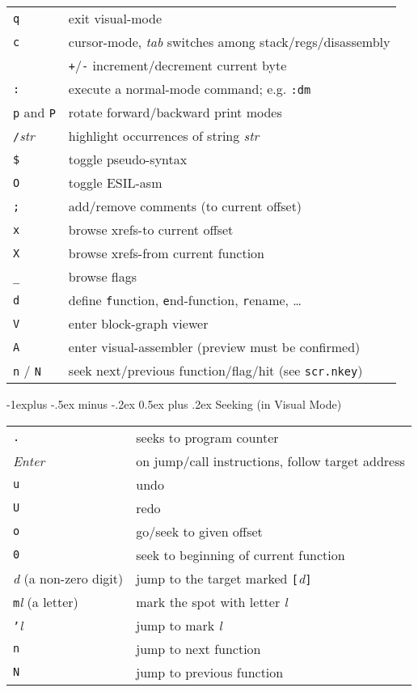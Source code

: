 \documentclass[a4paper,landscape]{article}
\makeatletter
\renewcommand{\subsection}{\@startsection{subsection}{2}{0mm}%
                                {-1explus -.5ex minus -.2ex}%
                                {0.5ex plus .2ex}%
                                {\normalfont\normalsize\bfseries}}
\makeatother
\begin{document}
\begin{multicols*}{3}
\begin{tabular}{@{}ll@{}}
\texttt{q} & exit visual-mode \\
\texttt{c} & cursor-mode, \textit{tab} switches among stack/regs/disassembly \\
& \texttt{+}/\texttt{-} increment/decrement current byte \\
\texttt{:} & execute a normal-mode command; e.g. \texttt{:dm} \\
\texttt{p} and \texttt{P} & rotate forward/backward print modes \\
\texttt{/}\textit{str} & highlight occurrences of string \textit{str} \\
\texttt{\$} & toggle pseudo-syntax \\
\texttt{O} & toggle ESIL-asm \\
\texttt{;} & add/remove comments (to current offset) \\
\texttt{x} & browse xrefs-to current offset \\
\texttt{X} & browse xrefs-from current function \\
\texttt{\_} & browse flags \\
\texttt{d} & define \texttt{f}unction, \texttt{e}nd-function, \texttt{r}ename, \ldots \\
\texttt{V} & enter block-graph viewer \\
\texttt{A} & enter visual-assembler (preview must be confirmed)\\
\texttt{n} / \texttt{N} & seek next/previous function/flag/hit (see \texttt{scr.nkey}) \\
\end{tabular}
\subsection{Seeking (in Visual Mode)}
\begin{tabular}{@{}ll@{}}
\texttt{.} & seeks to program counter \\
\textit{Enter} & on jump/call instructions, follow target address \\
\texttt{u} & undo \\
\texttt{U} & redo \\
\texttt{o} & go/seek to given offset \\
\texttt{0} & seek to beginning of current function \\
\textit{d} (a non-zero digit) & jump to the target marked \texttt{[}\textit{d}\texttt{]} \\
\texttt{m}\textit{l} (a letter) & mark the spot with letter \textit{l} \\
\texttt{'}\textit{l} & jump to mark \textit{l} \\
\texttt{n} & jump to next function \\
\texttt{N} & jump to previous function
\end{tabular}

\end{multicols*}
\end{document}
